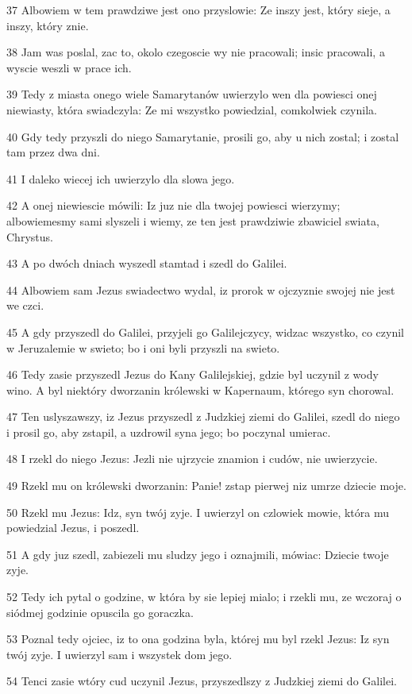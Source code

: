 \par 37 Albowiem w tem prawdziwe jest ono przyslowie: Ze inszy jest, który sieje, a inszy, który znie.
\par 38 Jam was poslal, zac to, okolo czegoscie wy nie pracowali; insic pracowali, a wyscie weszli w prace ich.
\par 39 Tedy z miasta onego wiele Samarytanów uwierzylo wen dla powiesci onej niewiasty, która swiadczyla: Ze mi wszystko powiedzial, comkolwiek czynila.
\par 40 Gdy tedy przyszli do niego Samarytanie, prosili go, aby u nich zostal; i zostal tam przez dwa dni.
\par 41 I daleko wiecej ich uwierzylo dla slowa jego.
\par 42 A onej niewiescie mówili: Iz juz nie dla twojej powiesci wierzymy; albowiemesmy sami slyszeli i wiemy, ze ten jest prawdziwie zbawiciel swiata, Chrystus.
\par 43 A po dwóch dniach wyszedl stamtad i szedl do Galilei.
\par 44 Albowiem sam Jezus swiadectwo wydal, iz prorok w ojczyznie swojej nie jest we czci.
\par 45 A gdy przyszedl do Galilei, przyjeli go Galilejczycy, widzac wszystko, co czynil w Jeruzalemie w swieto; bo i oni byli przyszli na swieto.
\par 46 Tedy zasie przyszedl Jezus do Kany Galilejskiej, gdzie byl uczynil z wody wino. A byl niektóry dworzanin królewski w Kapernaum, którego syn chorowal.
\par 47 Ten uslyszawszy, iz Jezus przyszedl z Judzkiej ziemi do Galilei, szedl do niego i prosil go, aby zstapil, a uzdrowil syna jego; bo poczynal umierac.
\par 48 I rzekl do niego Jezus: Jezli nie ujrzycie znamion i cudów, nie uwierzycie.
\par 49 Rzekl mu on królewski dworzanin: Panie! zstap pierwej niz umrze dziecie moje.
\par 50 Rzekl mu Jezus: Idz, syn twój zyje. I uwierzyl on czlowiek mowie, która mu powiedzial Jezus, i poszedl.
\par 51 A gdy juz szedl, zabiezeli mu sludzy jego i oznajmili, mówiac: Dziecie twoje zyje.
\par 52 Tedy ich pytal o godzine, w która by sie lepiej mialo; i rzekli mu, ze wczoraj o siódmej godzinie opuscila go goraczka.
\par 53 Poznal tedy ojciec, iz to ona godzina byla, której mu byl rzekl Jezus: Iz syn twój zyje. I uwierzyl sam i wszystek dom jego.
\par 54 Tenci zasie wtóry cud uczynil Jezus, przyszedlszy z Judzkiej ziemi do Galilei.

